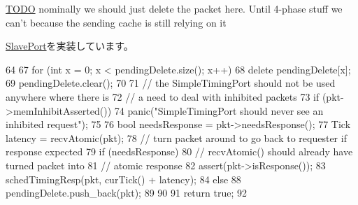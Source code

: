 \begin{Desc}
\item[\hyperlink{todo__todo000089}{TODO}]nominally we should just delete the packet here. Until 4-\/phase stuff we can't because the sending cache is still relying on it \end{Desc}


\hyperlink{classSlavePort_abcece77e42f88ee41af8d3d01bb48253}{SlavePort}を実装しています。


\begin{DoxyCode}
64 {
67     for (int x = 0; x < pendingDelete.size(); x++)
68         delete pendingDelete[x];
69     pendingDelete.clear();
70 
71     // the SimpleTimingPort should not be used anywhere where there is
72     // a need to deal with inhibited packets
73     if (pkt->memInhibitAsserted())
74         panic("SimpleTimingPort should never see an inhibited request\n");
75 
76     bool needsResponse = pkt->needsResponse();
77     Tick latency = recvAtomic(pkt);
78     // turn packet around to go back to requester if response expected
79     if (needsResponse) {
80         // recvAtomic() should already have turned packet into
81         // atomic response
82         assert(pkt->isResponse());
83         schedTimingResp(pkt, curTick() + latency);
84     } else {
88         pendingDelete.push_back(pkt);
89     }
90 
91     return true;
92 }
\end{DoxyCode}


